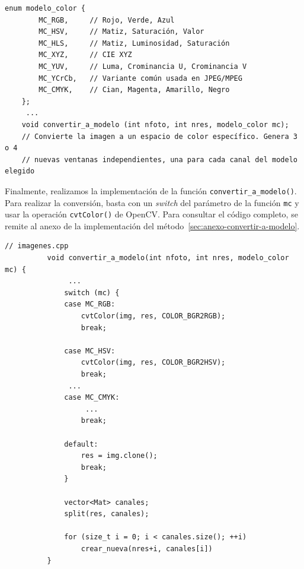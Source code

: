 \documentclass[11pt]{article}
\begin{document}
          \begin{lstlisting}[style=CppQtStyle, caption={Declaración del enum \texttt{modelo\_color} en \texttt{imagenes.h}.}, label={lst:imagenes-mc}]
    enum modelo_color {
        MC_RGB,     // Rojo, Verde, Azul
        MC_HSV,     // Matiz, Saturación, Valor
        MC_HLS,     // Matiz, Luminosidad, Saturación
        MC_XYZ,     // CIE XYZ
        MC_YUV,     // Luma, Crominancia U, Crominancia V
        MC_YCrCb,   // Variante común usada en JPEG/MPEG
        MC_CMYK,    // Cian, Magenta, Amarillo, Negro
    };
     ...
    void convertir_a_modelo (int nfoto, int nres, modelo_color mc);
    // Convierte la imagen a un espacio de color específico. Genera 3 o 4
    // nuevas ventanas independientes, una para cada canal del modelo elegido
\end{lstlisting}

          Finalmente, realizamos la implementación de la función
          \texttt{convertir\_a\_modelo()}. Para realizar la conversión, basta con un
          \textit{switch} del parámetro de la función \texttt{mc} y usar la operación
          \texttt{cvtColor()} de OpenCV. Para consultar el código completo, se remite al
          anexo de la implementación del método~\ref{sec:anexo-convertir-a-modelo}.

          \begin{lstlisting}[style=CppQtStyle, caption={Implementación de la función \texttt{convertir\_a\_modelo} en \texttt{imagenes.cpp} (selección de \texttt{cvtColor}).}, label={lst:imagenes-mc}]
          // imagenes.cpp
          void convertir_a_modelo(int nfoto, int nres, modelo_color mc) {
               ...
              switch (mc) {
              case MC_RGB:
                  cvtColor(img, res, COLOR_BGR2RGB);
                  break;

              case MC_HSV:
                  cvtColor(img, res, COLOR_BGR2HSV);
                  break;
               ...
              case MC_CMYK:
                   ...
                  break;

              default:
                  res = img.clone();
                  break;
              }

              vector<Mat> canales;
              split(res, canales);

              for (size_t i = 0; i < canales.size(); ++i)
                  crear_nueva(nres+i, canales[i])
          }
      \end{lstlisting}

          \clearpage
\end{document}
